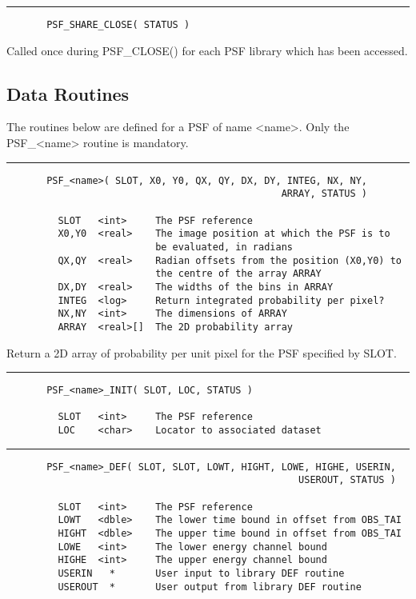 \rule{\textwidth}{0.5mm}
\begin{verbatim}
       PSF_SHARE_CLOSE( STATUS )
\end{verbatim}

       Called once during PSF\_CLOSE() for each PSF library which
       has been accessed.

\subsection{Data Routines}

    The routines below are defined for a PSF of name <name>. Only
    the PSF\_<name> routine is mandatory.

\rule{\textwidth}{0.5mm}
\begin{verbatim}
       PSF_<name>( SLOT, X0, Y0, QX, QY, DX, DY, INTEG, NX, NY,
                                                ARRAY, STATUS )

         SLOT   <int>     The PSF reference
         X0,Y0  <real>    The image position at which the PSF is to
                          be evaluated, in radians
         QX,QY  <real>    Radian offsets from the position (X0,Y0) to
                          the centre of the array ARRAY
         DX,DY  <real>    The widths of the bins in ARRAY
         INTEG  <log>     Return integrated probability per pixel?
         NX,NY  <int>     The dimensions of ARRAY
         ARRAY  <real>[]  The 2D probability array
\end{verbatim}

         Return a 2D array of probability per unit pixel for the
         PSF specified by SLOT.

\rule{\textwidth}{0.5mm}
\begin{verbatim}
       PSF_<name>_INIT( SLOT, LOC, STATUS )

         SLOT   <int>     The PSF reference
         LOC    <char>    Locator to associated dataset
\end{verbatim}

\rule{\textwidth}{0.5mm}
\begin{verbatim}
       PSF_<name>_DEF( SLOT, SLOT, LOWT, HIGHT, LOWE, HIGHE, USERIN,
                                                   USEROUT, STATUS )

         SLOT   <int>     The PSF reference
         LOWT   <dble>    The lower time bound in offset from OBS_TAI
         HIGHT  <dble>    The upper time bound in offset from OBS_TAI
         LOWE   <int>     The lower energy channel bound
         HIGHE  <int>     The upper energy channel bound
         USERIN   *       User input to library DEF routine
         USEROUT  *       User output from library DEF routine
\end{verbatim}

